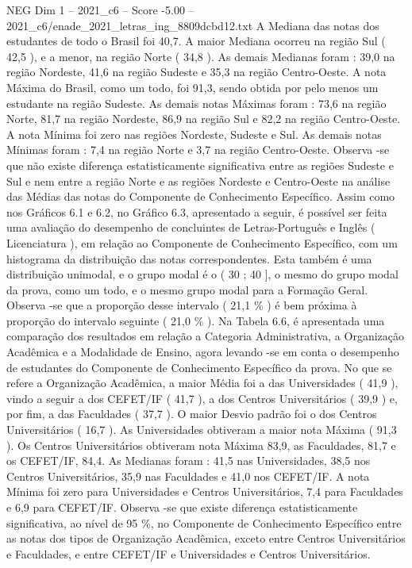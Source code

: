 \begin{textsample}{NEG Dim 1 – 2021\_c6 – Score -5.00 – 2021\_c6/enade\_2021\_letras\_ing\_8809dcbd12.txt}
A Mediana das notas dos estudantes de todo o Brasil foi 40,7.
A maior Mediana ocorreu na região Sul ( 42,5 ), e a menor, na região Norte ( 34,8 ).
As demais Medianas foram : 39,0 na região Nordeste, 41,6 na região Sudeste e 35,3 na região Centro-Oeste.
A nota Máxima do Brasil, como um todo, foi 91,3, sendo obtida por pelo menos um estudante na região Sudeste.
As demais notas Máximas foram : 73,6 na região Norte, 81,7 na região Nordeste, 86,9 na região Sul e 82,2 na região Centro-Oeste.
A nota Mínima foi zero nas regiões Nordeste, Sudeste e Sul.
As demais notas Mínimas foram : 7,4 na região Norte e 3,7 na região Centro-Oeste.
Observa -se que não existe diferença estatisticamente significativa entre as regiões Sudeste e Sul e nem entre a região Norte e as regiões Nordeste e Centro-Oeste na análise das Médias das notas do Componente de Conhecimento Específico.
Assim como nos Gráficos 6.1 e 6.2, no Gráfico 6.3, apresentado a seguir, é possível ser feita uma avaliação do desempenho de concluintes de Letras-Português e Inglês ( Licenciatura ), em relação ao Componente de Conhecimento Específico, com um histograma da distribuição das notas correspondentes.
Esta também é uma distribuição unimodal, e o grupo modal é o ( 30 ; 40 ], o mesmo do grupo modal da prova, como um todo, e o mesmo grupo modal para a Formação Geral.
Observa -se que a proporção desse intervalo ( 21,1 \% ) é bem próxima à proporção do intervalo seguinte ( 21,0 \% ).
Na Tabela 6.6, é apresentada uma comparação dos resultados em relação a Categoria Administrativa, a Organização Acadêmica e a Modalidade de Ensino, agora levando -se em conta o desempenho de estudantes do Componente de Conhecimento Específico da prova.
No que se refere a Organização Acadêmica, a maior Média foi a das Universidades ( 41,9 ), vindo a seguir a dos CEFET/IF ( 41,7 ), a dos Centros Universitários ( 39,9 ) e, por fim, a das Faculdades ( 37,7 ).
O maior Desvio padrão foi o dos Centros Universitários ( 16,7 ).
As Universidades obtiveram a maior nota Máxima ( 91,3 ).
Os Centros Universitários obtiveram nota Máxima 83,9, as Faculdades, 81,7 e os CEFET/IF, 84,4.
As Medianas foram : 41,5 nas Universidades, 38,5 nos Centros Universitários, 35,9 nas Faculdades e 41,0 nos CEFET/IF.
A nota Mínima foi zero para Universidades e Centros Universitários, 7,4 para Faculdades e 6,9 para CEFET/IF.
Observa -se que existe diferença estatisticamente significativa, ao nível de 95 \%, no Componente de Conhecimento Específico entre as notas dos tipos de Organização Acadêmica, exceto entre Centros Universitários e Faculdades, e entre CEFET/IF e Universidades e Centros Universitários.

\end{textsample}
